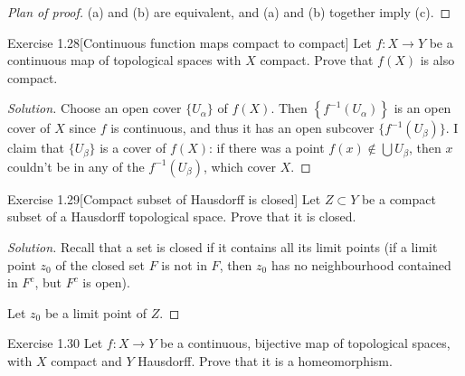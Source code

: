 \begin{proof}[Plan of proof]\leavevmode
	(a) and (b) are equivalent, and  (a) and (b) together imply (c).
\end{proof}


\begin{thing4}{Exercise 1.28}[Continuous function maps compact to compact]\label{exer:1.28}\leavevmode
Let $f:X\to Y$ be a continuous map of topological spaces with $X$ compact. Prove that $f(X)$ is also compact.
\end{thing4}

\begin{proof}[Solution]\leavevmode
	Choose an open cover $\{U_\alpha\}$ of $f(X)$. Then  $\left\{f^{-1}\left( U_\alpha \right) \right\}$ is an open cover of $X$ since $f$ is continuous, and thus it has an open subcover $\{f^{-1}(U_\beta)\}$. I claim that $\{U_\beta\}$ is a cover of $f(X)$: if there was a point $f(x) \not \in \bigcup U_\beta $, then $x$ couldn't be in any of the  $f^{-1}(U_\beta)$, which cover $X$. 
\end{proof}

\begin{thing4}{Exercise 1.29}[Compact subset of Hausdorff is closed]\label{exer:1.29}\leavevmode
Let $Z \subset Y$ be a compact subset of a Hausdorff topological space. Prove that it is closed.
\end{thing4}

\begin{proof}[Solution]\leavevmode
Recall that a set is closed if it contains all its limit points (if a limit point $z_0$ of the closed set $F$ is not in $F$, then $z_0$ has no neighbourhood contained in $F^c$, but $F^c$ is open).

Let $z_0$ be a limit point of $Z$. 
\end{proof}

\begin{thing4}{Exercise 1.30}\label{exer:1.30}\leavevmode
Let $f:X \to Y$ be a continuous, bijective map of topological spaces, with $X$ compact and $Y$ Hausdorff. Prove that it is a homeomorphism.
\end{thing4}

